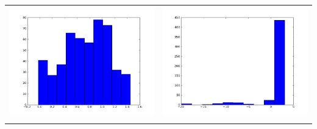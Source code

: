 \documentclass[12pt,a4paper,titlepage]{article}
\begin{document}
\begin{table}[ht]
\begin{tabular}{cc}
\includegraphics[scale=0.2]{p2th1_4}&\includegraphics[scale=0.2]{p2th2_4.png}\\
\newline

\end{tabular}
\end{table}
\end{document}

